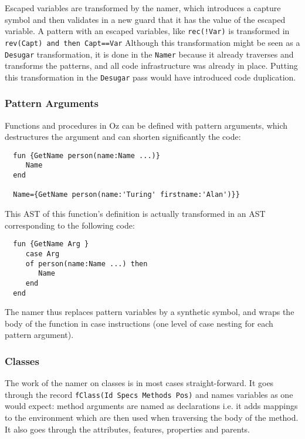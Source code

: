 \documentclass[a4paper]{memoir}
\begin{document}
Escaped variables are transformed by the namer, which introduces a capture
symbol and then validates in a new guard that it has the value of the escaped variable.
 A pattern with an escaped variables, like \lstinline$rec(!Var)$ is
transformed in \lstinline!rev(Capt) and then Capt==Var!
Although this transformation might be seen as a \lstinline!Desugar! transformation, it is
done in the \lstinline!Namer! because it already traverses and transforms the
patterns, and all code infrastructure was already in place. Putting this
transformation in the \lstinline!Desugar! pass would have introduced code duplication.


\subsubsection{Pattern Arguments}
Functions and procedures in Oz can be defined with pattern arguments, which
destructures the argument and can shorten significantly the code:
\begin{lstlisting}
  fun {GetName person(name:Name ...)}
     Name
  end

  Name={GetName person(name:'Turing' firstname:'Alan')}}
\end{lstlisting}

This AST of this function's definition is actually transformed in an AST corresponding to the following code:
\begin{lstlisting}
  fun {GetName Arg }
     case Arg
     of person(name:Name ...) then
        Name
     end
  end
\end{lstlisting}

The namer thus replaces pattern variables by a synthetic symbol, and wraps the body of the function in case instructions (one level of case nesting for each pattern argument). 





\subsubsection{Classes}\label{sec:arch:namer:classes}
The work of the namer on classes is in most cases straight-forward. It goes through the record
\lstinline!fClass(Id Specs Methods Pos)! and names variables as one would expect:
method arguments are named as declarations i.e. it adds mappings to the
environment which are then used when traversing the body of the method.
It also goes through the attributes, features, properties and parents.
\end{document}
